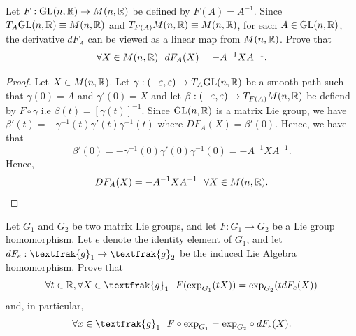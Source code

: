 \documentclass{article}
\begin{document}
\begin{problem}
    Let \( F: \text{GL}(n,\mathbb{R}) \to M(n,\mathbb{R})   \) be defined by \( F(A)  = A^{-1} \). Since \( {T}_{A}\text{GL}(n,\mathbb{R}) \equiv M(n,\mathbb{R})   \) and \( {T}_{F(A)} M(n,\mathbb{R}) \equiv M(n,\mathbb{R}) \), for each \( A \in \text{GL}(n,\mathbb{R}) \), the derivative \( d {F}_{A} \) can be viewed as a linear map from \( M(n,\mathbb{R}) \). Prove that 
    \[  \forall X \in M(n,\mathbb{R}) \ \ d {F}_{A}(X) = - A^{-1} X A^{-1}. \]
\end{problem}
\begin{proof}
    Let \( X \in M(n,\mathbb{R}) \). Let \( \gamma : (-\varepsilon, \varepsilon) \to {T}_{A} \text{GL}(n,\mathbb{R})   \) be a smooth path such that \( \gamma(0) = A  \) and \( \gamma'(0) = X \) and let \( \beta : (-\varepsilon, \varepsilon) \to {T}_{F(A)} M(n,\mathbb{R}) \) be defiend by \( F \circ \gamma  \) i.e \( \beta(t) = [\gamma(t)]^{-1} \). Since \( \text{GL}(n,\mathbb{R})   \) is a matrix Lie group, we have \( \beta'(t) = - \gamma^{-1}(t) \gamma'(t) \gamma^{-1}(t) \) where \( D {F}_{A}(X) = \beta'(0) \). Hence, we have that 
    \[  \beta'(0) = - \gamma^{-1}(0) \gamma'(0) \gamma^{-1}(0) = -A^{-1}X A^{-1}. \]
    Hence, 
    \[ D {F}_{A}(X) = - A^{-1} X A^{-1} \ \ \forall X \in M(n,\R). \]
\end{proof}

\begin{problem}
    Let \( {G}_{1}  \) and \( {G}_{2} \) be two matrix Lie groups, and let \( F: {G}_{1} \to {G}_{2} \) be a Lie group homomorphism. Let \( e  \) denote the identity element of \( {G}_{1} \), and let \( d {F}_{e} : \textfrak{g}_1 \to \textfrak{g}_2 \) be the induced Lie Algebra homomorphism. Prove that 
    \[  \forall t \in \R, \forall X \in \textfrak{g}_1 \ \ F(\text{exp}_{{G}_{1}}(tX)) = \text{exp}_{{G}_{2}}(t d{F}_{e} (X))  \]
    and, in particular,
    \[  \forall x \in {\textfrak{g}}_{1} \ \ F \circ \text{exp}_{{G}_{1}} = \text{exp}_{{G}_{2}} \circ d {F}_{e}(X).  \]
\end{problem}
\end{document}
